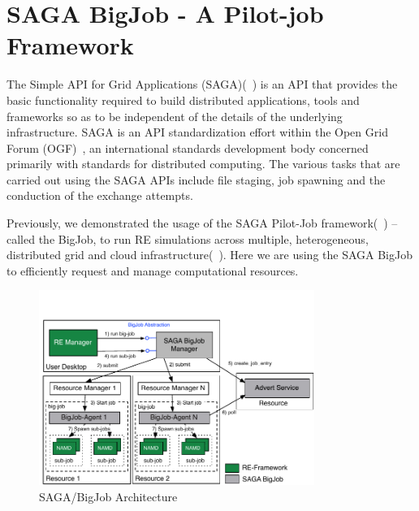 \documentclass{rspublic}
\newcommand{\alnote}[1]{ {\textcolor{blue} { ***andre: #1 }}}
\newcommand{\athotanote}[1]{ {\textcolor{green} { ***athota: #1 }}}
\newcommand{\alnote}[1]{}
\newcommand{\athotanote}[1]{}
\begin{document}



\section{SAGA BigJob - A Pilot-job Framework}

The Simple API for Grid Applications (SAGA)(~\citep{saga_gfd90}) is an API that provides the basic functionality required to build distributed applications, tools and frameworks so as to be independent of the details of the underlying infrastructure. SAGA is an API standardization effort within the Open Grid Forum (OGF)~\citep{ogf_web}, an international standards development body concerned primarily with standards for distributed computing. The various tasks that are carried out using the SAGA APIs include file staging, job spawning and the conduction of the exchange attempts.

Previously, we demonstrated the usage of the SAGA Pilot-Job framework(~\citep{saga_bigjob_condor_cloud}) -- called the BigJob, to run RE simulations across multiple, heterogeneous, distributed grid and cloud infrastructure(~\citep{Luckow:2008fp}). Here we are using the SAGA BigJob to efficiently request and manage computational resources. 

\begin{figure}[t]
      \centering
          \includegraphics[width=0.8\textwidth]{Bigjob_arch.pdf}
          \caption{\footnotesize SAGA/BigJob Architecture
              }
      \label{fig:bigjob}
\end{figure}
\end{document}
